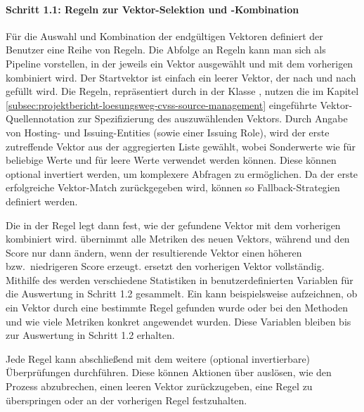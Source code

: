 \paragraph{Schritt 1.1: Regeln zur Vektor-Selektion und -Kombination} \label{par:projektbericht-loesungsweg-cvss-selection-rules-1-1}

Für die Auswahl und Kombination der endgültigen Vektoren definiert der Benutzer eine Reihe von Regeln.
Die Abfolge an Regeln kann man sich als Pipeline vorstellen, in der jeweils ein Vektor ausgewählt und mit dem vorherigen kombiniert wird.
Der Startvektor ist einfach ein leerer Vektor, der nach und nach gefüllt wird.
Die Regeln, repräsentiert durch  in der Klasse , nutzen die im Kapitel \ref{subsec:projektbericht-loesungsweg-cvss-source-management} eingeführte Vektor-Quellennotation zur Spezifizierung des auszuwählenden Vektors.
Durch Angabe von Hosting- und Issuing-Entities (sowie einer Issuing Role), wird der erste zutreffende Vektor aus der aggregierten Liste gewählt, wobei Sonderwerte wie \qt{*} für beliebige Werte und  für leere Werte verwendet werden können.
Diese können optional invertiert werden, um komplexere Abfragen zu ermöglichen.
Da der erste erfolgreiche Vektor-Match zurückgegeben wird, können so Fallback-Strategien definiert werden.

Die  in der Regel legt dann fest, wie der gefundene Vektor mit dem vorherigen kombiniert wird.
 übernimmt alle Metriken des neuen Vektors, während  und  den Score nur dann ändern, wenn der resultierende Vektor einen höheren bzw.\ niedrigeren Score erzeugt.
 ersetzt den vorherigen Vektor vollständig.
Mithilfe des  werden verschiedene Statistiken in benutzerdefinierten Variablen für die Auswertung in Schritt 1.2 gesammelt.
Ein  kann beispielsweise aufzeichnen, ob ein Vektor durch eine bestimmte Regel gefunden wurde oder bei den Methoden  und  wie viele Metriken konkret angewendet wurden.
Diese Variablen bleiben bis zur Auswertung in Schritt 1.2 erhalten.

Jede Regel kann abschließend mit dem  weitere (optional invertierbare) Überprüfungen durchführen.
Diese können Aktionen über  auslösen, wie den Prozess abzubrechen, einen leeren Vektor zurückzugeben, eine Regel zu überspringen oder an der vorherigen Regel festzuhalten.

